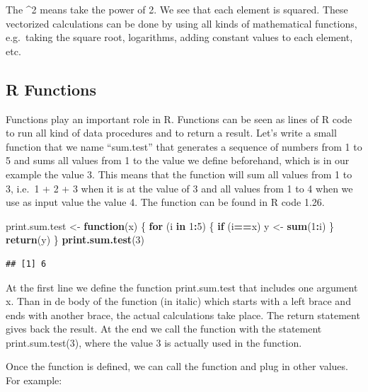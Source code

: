 \documentclass[]{book}
\newenvironment{Shaded}{\begin{snugshade}}{\end{snugshade}}
\newcommand{\KeywordTok}[1]{\textcolor[rgb]{0.13,0.29,0.53}{\textbf{#1}}}
\newcommand{\DecValTok}[1]{\textcolor[rgb]{0.00,0.00,0.81}{#1}}
\newcommand{\StringTok}[1]{\textcolor[rgb]{0.31,0.60,0.02}{#1}}
\newcommand{\ControlFlowTok}[1]{\textcolor[rgb]{0.13,0.29,0.53}{\textbf{#1}}}
\newcommand{\OperatorTok}[1]{\textcolor[rgb]{0.81,0.36,0.00}{\textbf{#1}}}
\newcommand{\NormalTok}[1]{#1}
\theoremstyle{definition}
\theoremstyle{definition}
\theoremstyle{definition}
\theoremstyle{remark}
\begin{document}
The \^{}2 means take the power of 2. We see that each element is
squared. These vectorized calculations can be done by using all kinds of
mathematical functions, e.g.~taking the square root, logarithms, adding
constant values to each element, etc.

\subsection{R Functions}\label{r-functions}

Functions play an important role in R. Functions can be seen as lines of
R code to run all kind of data procedures and to return a result. Let's
write a small function that we name ``sum.test'' that generates a
sequence of numbers from 1 to 5 and sums all values from 1 to the value
we define beforehand, which is in our example the value 3. This means
that the function will sum all values from 1 to 3, i.e.~1 + 2 + 3 when
it is at the value of 3 and all values from 1 to 4 when we use as input
value the value 4. The function can be found in R code 1.26.

\begin{Shaded}
\begin{Highlighting}[]
\NormalTok{print.sum.test <-}\StringTok{ }\ControlFlowTok{function}\NormalTok{(x) }
\NormalTok{\{}
 \ControlFlowTok{for}\NormalTok{ (i }\ControlFlowTok{in} \DecValTok{1}\OperatorTok{:}\DecValTok{5}\NormalTok{) }
\NormalTok{ \{}
   \ControlFlowTok{if}\NormalTok{ (i}\OperatorTok{==}\NormalTok{x) y <-}\StringTok{ }\KeywordTok{sum}\NormalTok{(}\DecValTok{1}\OperatorTok{:}\NormalTok{i)  }
\NormalTok{ \}}
\KeywordTok{return}\NormalTok{(y)}
\NormalTok{\}}
\KeywordTok{print.sum.test}\NormalTok{(}\DecValTok{3}\NormalTok{)}
\end{Highlighting}
\end{Shaded}

\begin{verbatim}
## [1] 6
\end{verbatim}

At the first line we define the function print.sum.test that includes
one argument x. Than in de body of the function (in italic) which starts
with a left brace and ends with another brace, the actual calculations
take place. The return statement gives back the result. At the end we
call the function with the statement print.sum.test(3), where the value
3 is actually used in the function.

Once the function is defined, we can call the function and plug in other
values. For example:
\end{document}
